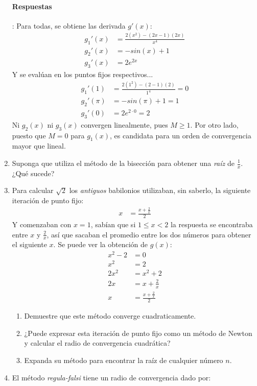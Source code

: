 \documentclass[spanish, fleqn]{article}
\begin{document}
\begin{enumerate}
\paragraph{Respuestas}: Para todas, se obtiene las derivada $g'(x)$:
\begin{align*}
g_1'(x) &= \frac{2(x^2)-(2x-1)(2x)}{x^4}
\\ g_2'(x) &= -sin(x)+1
\\ g_3'(x) &= 2 e^{2x}
\end{align*}
Y se evalúan en los puntos fijos respectivos...
\begin{align*}
g_1'(1) &= \frac{2(1^2)-(2-1)(2)}{1^4} = 0
\\ g_2'(\pi) &= -sin(\pi)+1 = 1
\\ g_3'(0) &= 2 e^{2\cdot 0} = 2
\end{align*}
Ni $g_2(x)$ ni $g_3(x)$ convergen linealmente, pues $M\geq 1$. Por otro lado, puesto que $M=0$ para $g_1(x)$, es candidata para un orden de convergencia mayor que lineal.
\item Suponga que utiliza el método de la bisección para obtener una \emph{raíz} de $\frac{1}{x}$. ¿Qué sucede?
\item Para calcular $\sqrt{2}$ los \emph{antiguos} babilonios utilizaban, sin saberlo, la siguiente iteración de punto fijo:
\begin{align*}
x &= \frac{x+\frac{2}{x}}{2}
\end{align*}
Y comenzaban con $x=1$, sabían que si $1\leq x<2$ la respuesta se encontraba entre $x$ y $\frac{2}{x}$, así que sacaban el promedio entre los dos números para obtener el siguiente $x$. Se puede ver la obtención de $g(x)$:
\begin{align*}
x^2 -2 &= 0
\\ x^2 &= 2
\\ 2x^2 &= x^2+2
\\ 2x &= x+\frac{2}{x}
\\ x &= \frac{x+\frac{2}{x}}{2}
\end{align*}
\begin{enumerate}
\item Demuestre que este método converge cuadraticamente.
\item ¿Puede expresar esta iteración de punto fijo como un método de Newton y calcular el radio de convergencia cuadrática?
\item Expanda su método para encontrar la raíz de cualquier número $n$.
\end{enumerate}
\item El método \emph{regula-falsi} tiene un radio de convergencia dado por:

\end{enumerate}
\end{document}
